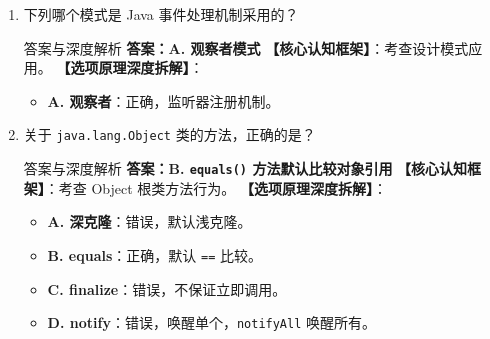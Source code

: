 ﻿\documentclass[12pt, a4paper]{ctexart}
\newcommand{\code}[1]{\texttt{#1}}
\begin{document}
\begin{enumerate}[label=\arabic*., itemsep=1.5em]
	\item 下列哪个模式是 Java 事件处理机制采用的？
	      \begin{bluebox}{答案与深度解析}
		      \textbf{答案：A. 观察者模式}
		      \textbf{【核心认知框架】}：考查设计模式应用。
		      \textbf{【选项原理深度拆解】}：
		      \begin{itemize}[leftmargin=*, nosep]
			      \item \textbf{A. 观察者}：正确，监听器注册机制。
		      \end{itemize}
	      \end{bluebox}

	\item 关于 \code{java.lang.Object} 类的方法，正确的是？
	      \begin{bluebox}{答案与深度解析}
		      \textbf{答案：B. \code{equals()} 方法默认比较对象引用}
		      \textbf{【核心认知框架】}：考查 Object 根类方法行为。
		      \textbf{【选项原理深度拆解】}：
		      \begin{itemize}[leftmargin=*, nosep]
			      \item \textbf{A. 深克隆}：错误，默认浅克隆。
			      \item \textbf{B. equals}：正确，默认 \code{==} 比较。
			      \item \textbf{C. finalize}：错误，不保证立即调用。
			      \item \textbf{D. notify}：错误，唤醒单个，\code{notifyAll} 唤醒所有。
		      \end{itemize}
	      \end{bluebox}


\end{enumerate}
\end{document}
